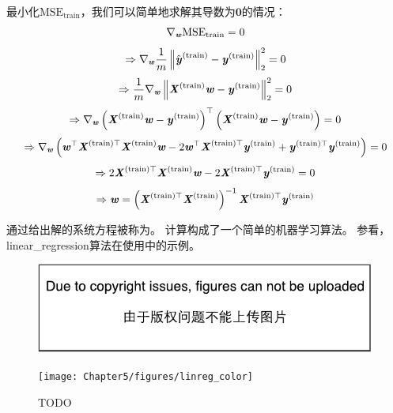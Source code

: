 最小化$\text{MSE}_{\text{train}}$，我们可以简单地求解其导数为$\mathbf{0}$的情况：
\begin{equation}
\nabla_{\boldsymbol{\mathit{w}}} \text{MSE}_{\text{train}} = 0
\end{equation}
\begin{equation}
\Rightarrow \nabla_{\boldsymbol{\mathit{w}}} \frac{1}{m} \left\lVert \hat{\boldsymbol{\mathit{y}}}^{(\text{train})} - \boldsymbol{\mathit{y}}^{(\text{train})}\right\rVert_2^2 = 0
\end{equation}
\begin{equation}
\Rightarrow \frac{1}{m} \nabla_{\boldsymbol{\mathit{w}}} \left\lVert \boldsymbol{\mathit{X}}^{(\text{train})}\boldsymbol{\mathit{w}} - \boldsymbol{\mathit{y}}^{(\text{train})}\right\rVert_2^2 = 0
\end{equation}
\begin{equation}
\Rightarrow \nabla_{\boldsymbol{\mathit{w}}} \left( \boldsymbol{\mathit{X}}^{(\text{train})}\boldsymbol{\mathit{w}} - \boldsymbol{\mathit{y}}^{(\text{train})} \right)^\top \left( \boldsymbol{\mathit{X}}^{(\text{train})}\boldsymbol{\mathit{w}} - \boldsymbol{\mathit{y}}^{(\text{train})} \right) = 0
\end{equation}
\begin{equation}
\Rightarrow \nabla_{\boldsymbol{\mathit{w}}} \left( 
    \boldsymbol{\mathit{w}}^\top \boldsymbol{\mathit{X}}^{(\text{train})\top}\boldsymbol{\mathit{X}}^{(\text{train})}\boldsymbol{\mathit{w}} - 2\boldsymbol{\mathit{w}}^\top\boldsymbol{\mathit{X}}^{(\text{train})\top} \boldsymbol{\mathit{y}}^{(\text{train})} + \boldsymbol{\mathit{y}}^{(\text{train})\top}\boldsymbol{\mathit{y}}^{(\text{train})}  
  \right) = 0
\end{equation}
\begin{equation}
    \Rightarrow 2\boldsymbol{\mathit{X}}^{(\text{train})\top}\boldsymbol{\mathit{X}}^{(\text{train})} \boldsymbol{\mathit{w}}  -
    2\boldsymbol{\mathit{X}}^{(\text{train})\top} \boldsymbol{\mathit{y}}^{(\text{train})}  = 0
\end{equation}
\begin{equation}
\label{eq:5.12}
    \Rightarrow \Vw =  \left(\MX^{(\text{train})\Tsp}\MX^{(\text{train})}
     \right)^{-1} \MX^{(\text{train})\Tsp} \Vy^{(\text{train})}
\end{equation}


通过给出解的系统方程被称为。
计算构成了一个简单的机器学习算法。
参看，\gls{linear_regression}算法在使用中的示例。

\begin{figure}[!htb]
\ifOpenSource
\centerline{\includegraphics{figure.pdf}}
\else
\centerline{\texttt{[image: Chapter5/figures/linreg\_color]}}
\fi
\caption{TODO}
\label{fig:chap5_linreg}
\end{figure}

